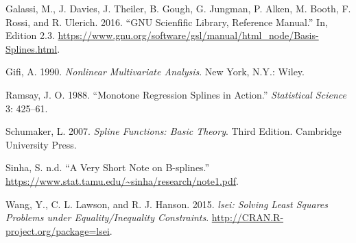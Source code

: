 \documentclass[
  12pt,
]{article}
\newlength{\cslhangindent}
\newenvironment{cslreferences}%
  {\setlength{\parindent}{0pt}%
  \everypar{\setlength{\hangindent}{\cslhangindent}}\ignorespaces}%
  {\par}
\begin{document}
\begin{cslreferences}
\leavevmode\hypertarget{ref-gsl_manual_16}{}%
Galassi, M., J. Davies, J. Theiler, B. Gough, G. Jungman, P. Alken, M.
Booth, F. Rossi, and R. Ulerich. 2016. ``GNU Scienfific Library,
Reference Manual.'' In, Edition 2.3.
\url{https://www.gnu.org/software/gsl/manual/html_node/Basis-Splines.html}.

\leavevmode\hypertarget{ref-gifi_B_90}{}%
Gifi, A. 1990. \emph{Nonlinear Multivariate Analysis}. New York, N.Y.:
Wiley.

\leavevmode\hypertarget{ref-ramsay_88}{}%
Ramsay, J. O. 1988. ``Monotone Regression Splines in Action.''
\emph{Statistical Science} 3: 425--61.

\leavevmode\hypertarget{ref-schumaker_07}{}%
Schumaker, L. 2007. \emph{Spline Functions: Basic Theory}. Third
Edition. Cambridge University Press.

\leavevmode\hypertarget{ref-sinha}{}%
Sinha, S. n.d. ``A Very Short Note on B-splines.''
\url{https://www.stat.tamu.edu/~sinha/research/note1.pdf}.

\leavevmode\hypertarget{ref-wang_lawson_hanson_15}{}%
Wang, Y., C. L. Lawson, and R. J. Hanson. 2015. \emph{lsei: Solving
Least Squares Problems under Equality/Inequality Constraints}.
\url{http://CRAN.R-project.org/package=lsei}.
\end{cslreferences}
\end{document}
